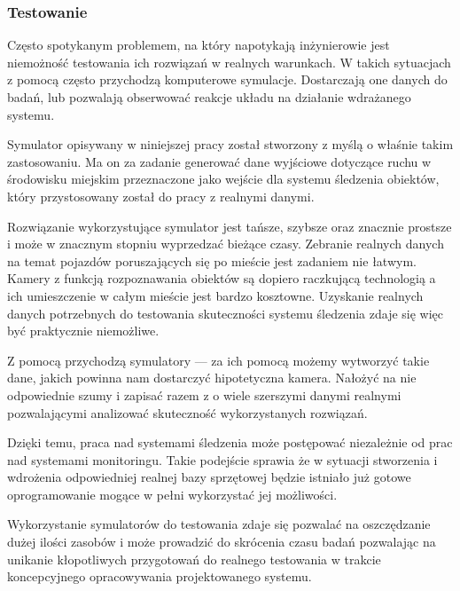 \subsubsection{Testowanie}
\par{
Często spotykanym problemem, na który napotykają inżynierowie jest niemożność testowania ich rozwiązań w realnych warunkach. W takich sytuacjach z pomocą często przychodzą komputerowe symulacje. Dostarczają one danych do badań, lub pozwalają obserwować reakcje układu na działanie wdrażanego systemu.
}
\par{
Symulator opisywany w niniejszej pracy został stworzony z myślą o właśnie takim zastosowaniu. Ma on za zadanie generować dane wyjściowe dotyczące ruchu w środowisku miejskim przeznaczone jako wejście dla systemu śledzenia obiektów, który przystosowany został do pracy z realnymi danymi.
}
\par{
Rozwiązanie wykorzystujące symulator jest tańsze, szybsze oraz znacznie prostsze i może w znacznym stopniu wyprzedzać bieżące czasy.
Zebranie realnych danych na temat pojazdów poruszających się po mieście jest zadaniem nie łatwym. Kamery z funkcją rozpoznawania obiektów są dopiero raczkującą technologią a ich umieszczenie w całym mieście jest bardzo kosztowne. Uzyskanie realnych danych potrzebnych do testowania skuteczności systemu śledzenia zdaje się więc być praktycznie niemożliwe.
}
\par{
Z pomocą przychodzą symulatory --- za ich pomocą możemy wytworzyć takie dane, jakich powinna nam dostarczyć hipotetyczna kamera. Nałożyć na nie odpowiednie szumy i zapisać razem z o wiele szerszymi danymi realnymi pozwalającymi analizować skuteczność wykorzystanych rozwiązań.
}
\par{
Dzięki temu, praca nad systemami śledzenia może postępować niezależnie od prac nad systemami monitoringu. Takie podejście sprawia że w sytuacji stworzenia i wdrożenia odpowiedniej realnej bazy sprzętowej będzie istniało już gotowe oprogramowanie mogące w pełni wykorzystać jej możliwości.
}
\par{
Wykorzystanie symulatorów do testowania zdaje się pozwalać na oszczędzanie dużej ilości zasobów i może prowadzić do skrócenia czasu badań pozwalając na unikanie kłopotliwych przygotowań do realnego testowania w trakcie koncepcyjnego opracowywania projektowanego systemu.
}

